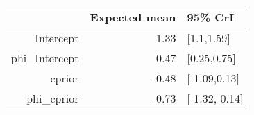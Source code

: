 \begin{tabular}{rrl}
  \hline
 & Expected mean & 95\% CrI \\ 
  \hline
Intercept & 1.33 & [1.1,1.59] \\ 
  phi\_Intercept & 0.47 & [0.25,0.75] \\ 
  cprior & -0.48 & [-1.09,0.13] \\ 
  phi\_cprior & -0.73 & [-1.32,-0.14] \\ 
   \hline
\end{tabular}

